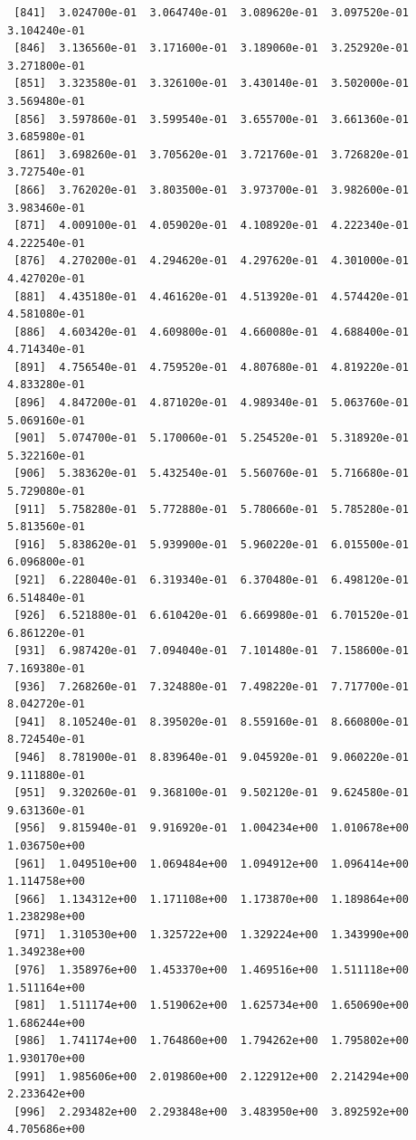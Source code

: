 \documentclass[12pt,letterpaper]{article}\usepackage[]{graphicx}\usepackage[]{color}
\begin{document}
\begin{lstlisting}
 [841]  3.024700e-01  3.064740e-01  3.089620e-01  3.097520e-01  3.104240e-01
 [846]  3.136560e-01  3.171600e-01  3.189060e-01  3.252920e-01  3.271800e-01
 [851]  3.323580e-01  3.326100e-01  3.430140e-01  3.502000e-01  3.569480e-01
 [856]  3.597860e-01  3.599540e-01  3.655700e-01  3.661360e-01  3.685980e-01
 [861]  3.698260e-01  3.705620e-01  3.721760e-01  3.726820e-01  3.727540e-01
 [866]  3.762020e-01  3.803500e-01  3.973700e-01  3.982600e-01  3.983460e-01
 [871]  4.009100e-01  4.059020e-01  4.108920e-01  4.222340e-01  4.222540e-01
 [876]  4.270200e-01  4.294620e-01  4.297620e-01  4.301000e-01  4.427020e-01
 [881]  4.435180e-01  4.461620e-01  4.513920e-01  4.574420e-01  4.581080e-01
 [886]  4.603420e-01  4.609800e-01  4.660080e-01  4.688400e-01  4.714340e-01
 [891]  4.756540e-01  4.759520e-01  4.807680e-01  4.819220e-01  4.833280e-01
 [896]  4.847200e-01  4.871020e-01  4.989340e-01  5.063760e-01  5.069160e-01
 [901]  5.074700e-01  5.170060e-01  5.254520e-01  5.318920e-01  5.322160e-01
 [906]  5.383620e-01  5.432540e-01  5.560760e-01  5.716680e-01  5.729080e-01
 [911]  5.758280e-01  5.772880e-01  5.780660e-01  5.785280e-01  5.813560e-01
 [916]  5.838620e-01  5.939900e-01  5.960220e-01  6.015500e-01  6.096800e-01
 [921]  6.228040e-01  6.319340e-01  6.370480e-01  6.498120e-01  6.514840e-01
 [926]  6.521880e-01  6.610420e-01  6.669980e-01  6.701520e-01  6.861220e-01
 [931]  6.987420e-01  7.094040e-01  7.101480e-01  7.158600e-01  7.169380e-01
 [936]  7.268260e-01  7.324880e-01  7.498220e-01  7.717700e-01  8.042720e-01
 [941]  8.105240e-01  8.395020e-01  8.559160e-01  8.660800e-01  8.724540e-01
 [946]  8.781900e-01  8.839640e-01  9.045920e-01  9.060220e-01  9.111880e-01
 [951]  9.320260e-01  9.368100e-01  9.502120e-01  9.624580e-01  9.631360e-01
 [956]  9.815940e-01  9.916920e-01  1.004234e+00  1.010678e+00  1.036750e+00
 [961]  1.049510e+00  1.069484e+00  1.094912e+00  1.096414e+00  1.114758e+00
 [966]  1.134312e+00  1.171108e+00  1.173870e+00  1.189864e+00  1.238298e+00
 [971]  1.310530e+00  1.325722e+00  1.329224e+00  1.343990e+00  1.349238e+00
 [976]  1.358976e+00  1.453370e+00  1.469516e+00  1.511118e+00  1.511164e+00
 [981]  1.511174e+00  1.519062e+00  1.625734e+00  1.650690e+00  1.686244e+00
 [986]  1.741174e+00  1.764860e+00  1.794262e+00  1.795802e+00  1.930170e+00
 [991]  1.985606e+00  2.019860e+00  2.122912e+00  2.214294e+00  2.233642e+00
 [996]  2.293482e+00  2.293848e+00  3.483950e+00  3.892592e+00  4.705686e+00
\end{lstlisting}
\end{document}
